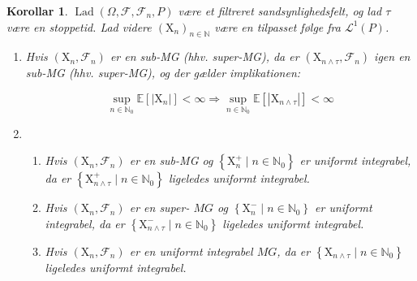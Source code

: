 \documentclass{article}
\newcommand{\1}{\mathbbm{1}}
\theoremstyle{boxed}
\newtheorem{corollary}[theorem]{Korollar}
\begin{document}
\begin{theorem-box}
    \begin{corollary}
        $\operatorname{Lad}\left(\Omega, \mathcal{F}, \mathcal{F}_n, P\right)$ være et filtreret sandsynlighedsfelt, og lad $\tau$ være en stoppetid. Lad videre $\left(\mathrm{X}_n\right)_{n \in \mathbb{N}}$ være en tilpasset følge fra $\mathcal{L}^1(P)$.
\begin{enumerate}
    \item[\textnormal{(i)}] Hvis $\left(\mathrm{X}_n, \mathcal{F}_n\right)$ er en sub-MG (hhv. super-MG), da er $\left(\mathrm{X}_{n \wedge \tau}, \mathcal{F}_n\right)$ igen en sub-MG (hhv. super-MG), og der gælder implikationen:

    $$
    \sup _{n \in \mathbb{N}_0} \mathbb{E}\left[\left|\mathrm{X}_n\right|\right]<\infty \Longrightarrow \sup _{n \in \mathbb{N}_0} \mathbb{E}\left[\left|\mathrm{X}_{n \wedge \tau}\right|\right]<\infty
    $$
    \item[\textnormal{(ii)}]\begin{enumerate}
        \item[\textnormal{(a)}]  Hvis $\left(\mathrm{X}_n, \mathcal{F}_n\right)$ er en sub-MG og $\left\{\mathrm{X}_n^{+} \mid n \in \mathbb{N}_0\right\}$ er uniformt integrabel, da er $\left\{\mathrm{X}_{n \wedge \tau}^{+} \mid n \in \mathbb{N}_0\right\}$ ligeledes uniformt integrabel.
        \item[\textnormal{(b)}] Hvis $\left(\mathrm{X}_n, \mathcal{F}_n\right)$ er en super- $M G$ og $\left\{\mathrm{X}_n^{-} \mid n \in \mathbb{N}_0\right\}$ er uniformt integrabel, da er $\left\{\mathrm{X}_{n \wedge \tau}^{-} \mid n \in \mathbb{N}_0\right\}$ ligeledes uniformt integrabel.
        \item[\textnormal{(c)}] Hvis $\left(\mathrm{X}_n, \mathcal{F}_n\right)$ er en uniformt integrabel $M G$, da er $\left\{\mathrm{X}_{n \wedge \tau} \mid n \in \mathbb{N}_0\right\}$ ligeledes uniformt integrabel.
    \end{enumerate} 
\end{enumerate}
    \end{corollary}
\end{theorem-box}
\end{document}
